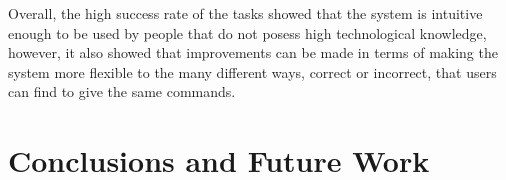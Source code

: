 \documentclass[runningheads]{llncs}
\begin{document}


Overall, the high success rate of the tasks showed that the system is intuitive enough to be used by people that do not posess high technological knowledge, however, it also showed that improvements can be made in terms of making the system more flexible to the many different ways, correct or incorrect, that users can find to give the same commands.

\section{Conclusions and Future Work}
\end{document}

